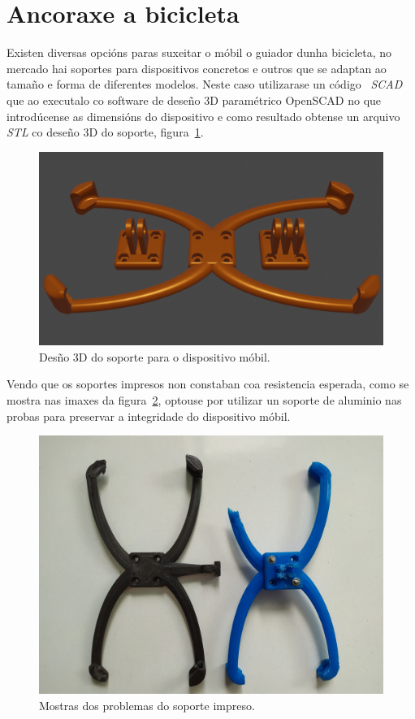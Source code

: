 \section{Ancoraxe a bicicleta}
Existen diversas opcións paras suxeitar o móbil o guiador dunha bicicleta, no mercado hai soportes para dispositivos concretos e outros que se adaptan ao tamaño e forma de diferentes modelos. Neste caso utilizarase un código~\cite{thingiverse.comCustomizableBikeMount} \emph{SCAD} que ao executalo co software de deseño 3D paramétrico OpenSCAD no que introdúcense as dimensións do dispositivo e como resultado obtense un arquivo \emph{STL} co deseño 3D do soporte, figura~\ref{fig:soporte_mobil}.
\begin{figure}[tbp]
  \centering
  \includegraphics[scale=.2]{imaxes/soporte-mobil.png}
  \caption{Desño 3D do soporte para o dispositivo móbil.}
  \label{fig:soporte_mobil}
\end{figure}
Vendo que os soportes impresos non constaban coa resistencia esperada, como se mostra nas imaxes da figura~\ref{fig:fallos_soporte}, optouse por utilizar un soporte de aluminio nas probas para preservar a integridade do dispositivo móbil.
\begin{figure}[tbp]
  \centering
  \includegraphics[scale=.08]{imaxes/fallos-soporte.jpg}
  \caption{Mostras dos problemas do soporte impreso.}
  \label{fig:fallos_soporte}
\end{figure}
